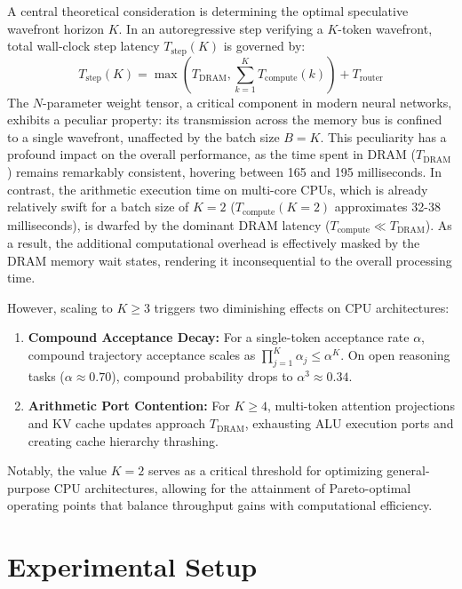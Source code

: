 \documentclass[journal,10pt,twocolumn]{article}
\theoremstyle{definition}
\begin{document}
A central theoretical consideration is determining the optimal speculative wavefront horizon $K$. In an autoregressive step verifying a $K$-token wavefront, total wall-clock step latency $T_{\text{step}}(K)$ is governed by:
\begin{equation}
T_{\text{step}}(K) = \max\left( T_{\text{DRAM}}, \sum_{k=1}^K T_{\text{compute}}(k) \right) + T_{\text{router}}
\end{equation}
The $N$-parameter weight tensor, a critical component in modern neural networks, exhibits a peculiar property: its transmission across the memory bus is confined to a single wavefront, unaffected by the batch size $B=K$. This peculiarity has a profound impact on the overall performance, as the time spent in DRAM ($T_{\text{DRAM}}$) remains remarkably consistent, hovering between 165 and 195 milliseconds. In contrast, the arithmetic execution time on multi-core CPUs, which is already relatively swift for a batch size of $K=2$ ($T_{\text{compute}}(K=2)$ approximates 32-38 milliseconds), is dwarfed by the dominant DRAM latency ($T_{\text{compute}} \ll T_{\text{DRAM}}$). As a result, the additional computational overhead is effectively masked by the DRAM memory wait states, rendering it inconsequential to the overall processing time.

However, scaling to $K \ge 3$ triggers two diminishing effects on CPU architectures:
\begin{enumerate}
    \item \textbf{Compound Acceptance Decay:} For a single-token acceptance rate $\alpha$, compound trajectory acceptance scales as $\prod_{j=1}^K \alpha_j \le \alpha^K$. On open reasoning tasks ($\alpha \approx 0.70$), compound probability drops to $\alpha^3 \approx 0.34$.
    \item \textbf{Arithmetic Port Contention:} For $K \ge 4$, multi-token attention projections and KV cache updates approach $T_{\text{DRAM}}$, exhausting ALU execution ports and creating cache hierarchy thrashing.
\end{enumerate}
Notably, the value $K=2$ serves as a critical threshold for optimizing general-purpose CPU architectures, allowing for the attainment of Pareto-optimal operating points that balance throughput gains with computational efficiency.

\section{Experimental Setup}
\end{document}
